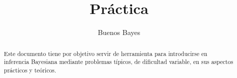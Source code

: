 \documentclass[a4paper,10pt]{article}
\title{Pr\'actica}
\author{Buenos Bayes}
\begin{document}
\maketitle

\begin{abstract}
 Este documento tiene por objetivo servir de herramienta para introducirse en inferencia Bayesiana mediante problemas t\'ipicos, de dificultad variable, en sus aspectos pr\'acticos y te\'oricos.
\end{abstract}

\tableofcontents 


\newpage

\newpage

\newpage

\end{document}
